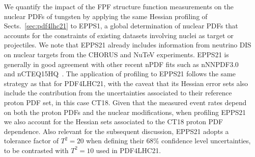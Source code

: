 We quantify the impact of the FPF structure function measurements
on the nuclear PDFs of tungsten by applying the same Hessian profiling
of Sects.~\ref{sec:pdf4lhc21} to EPPS1, a global determination of nuclear PDFs
that accounts for the constraints of existing datasets involving nuclei as target or projectiles.
%
We note that EPPS21 already includes information from neutrino DIS on nuclear targets
from the CHORUS and NuTeV experiments.
%
EPPS21 is generally in good agreement with other recent nPDF fits such as nNNPDF3.0~\cite{AbdulKhalek:2022fyi}
and nCTEQ15HQ~\cite{Duwentaster:2022kpv}.
%
The application of profiling to EPPS21 follows the same strategy as that
for PDF4LHC21, with the caveat that its Hessian error sets also include the contribution
from the uncertainties  associated to their reference proton PDF set, in this case CT18.
%
Given that the measured event rates depend on both the proton PDFs and the nuclear modifications,
when profiling EPPS21 we also account for the Hessian sets associated to the CT18 proton
PDF dependence.
%
Also relevant for the subsequent discussion, EPPS21 adopts a tolerance
factor of $T^2 = 20$ when defining their  68\%  confidence level uncertainties,
to be contrasted with  $T^2 = 10$ used in PDF4LHC21.


